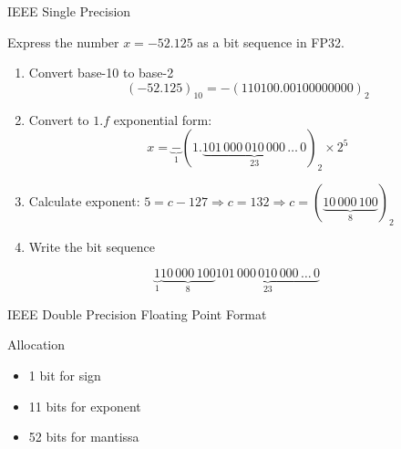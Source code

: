 \documentclass[10pt]{beamer}
\begin{document}
\begin{frame}{IEEE Single Precision}

\begin{example}
    Express the number $x = -52.125$ as a bit sequence in FP32.
\end{example}

\begin{enumerate}
  \item Convert base-10 to base-2 
  $$ (-52.125)_{10}=-(110100.00100000000)_2$$
  \item Convert to $1.f$ exponential form:
    $$x=\underbrace{-}_{1}(1.\underbrace{101\,000\,010\,000\,\dots\,0}_{23})_2\times
2^{5}$$
  \item Calculate exponent: $5 = c-127 \Rightarrow c = 132 \Rightarrow c =
(\underbrace{10\,000\,100}_{8})_2$
\item Write the bit sequence
\end{enumerate}

\begin{equation*}
\underbrace{1}_{1}
\underbrace{10\,000\,100}_{8}
\underbrace{101\,000\,010\,000\,\dots\,0}_{23}
\end{equation*}
\end{frame}
\begin{frame}{IEEE Double Precision Floating Point Format}

{}
\begin{center}
\end{center}

\begin{block}{Allocation}
\begin{itemize}
  \item 1 bit for sign
  \item 11 bits for exponent
  \item 52 bits for mantissa
\end{itemize}
\end{block}
\end{frame}
\end{document}
